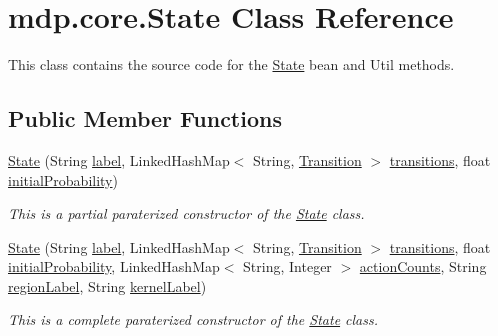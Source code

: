 \hypertarget{classmdp_1_1core_1_1_state}{}\section{mdp.\+core.\+State Class Reference}
\label{classmdp_1_1core_1_1_state}


This class contains the source code for the \hyperlink{classmdp_1_1core_1_1_state}{State} bean and Util methods.  


\subsection*{Public Member Functions}
\begin{DoxyCompactItemize}
\item 
\hyperlink{classmdp_1_1core_1_1_state_a7454bf82c89c8fbcf1133e8450af5042}{State} (String \hyperlink{classmdp_1_1core_1_1_state_a40b54cc46e175c748d5ce129aba70633}{label}, Linked\+Hash\+Map$<$ String, \hyperlink{classmdp_1_1core_1_1_transition}{Transition} $>$ \hyperlink{classmdp_1_1core_1_1_state_a3c9b563199f7e235fe083b0d16da8cf3}{transitions}, float \hyperlink{classmdp_1_1core_1_1_state_a237d2d5f81db0553a2180cf66a20472b}{initial\+Probability})
\begin{DoxyCompactList}\small\item\em This is a partial paraterized constructor of the \hyperlink{classmdp_1_1core_1_1_state}{State} class. \end{DoxyCompactList}\item 
\hyperlink{classmdp_1_1core_1_1_state_a34f8a7e42ef506e40daa65bce24f258d}{State} (String \hyperlink{classmdp_1_1core_1_1_state_a40b54cc46e175c748d5ce129aba70633}{label}, Linked\+Hash\+Map$<$ String, \hyperlink{classmdp_1_1core_1_1_transition}{Transition} $>$ \hyperlink{classmdp_1_1core_1_1_state_a3c9b563199f7e235fe083b0d16da8cf3}{transitions}, float \hyperlink{classmdp_1_1core_1_1_state_a237d2d5f81db0553a2180cf66a20472b}{initial\+Probability}, Linked\+Hash\+Map$<$ String, Integer $>$ \hyperlink{classmdp_1_1core_1_1_state_a56e17de2fde7a7f4ee8b1491c11438d5}{action\+Counts}, String \hyperlink{classmdp_1_1core_1_1_state_aa6f24dca5cb78d028e99f69b9e6ccb2c}{region\+Label}, String \hyperlink{classmdp_1_1core_1_1_state_ac7ca184df7a0ec4141766692290c18ab}{kernel\+Label})
\begin{DoxyCompactList}\small\item\em This is a complete paraterized constructor of the \hyperlink{classmdp_1_1core_1_1_state}{State} class. \end{DoxyCompactList}\item 

\end{DoxyCompactItemize}
